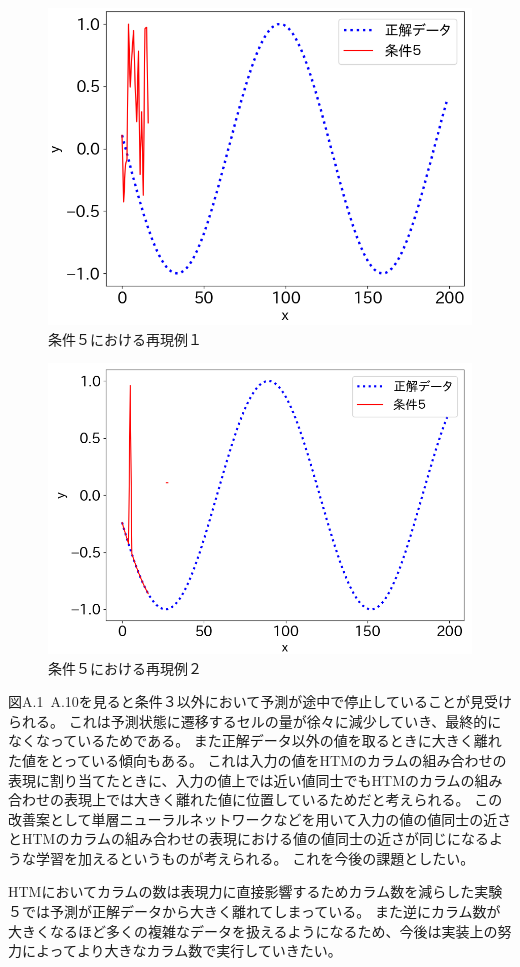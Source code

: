 \begin{figure}[hp]
  \begin{center}
    \includegraphics[width=12cm]{./fig/append9}
    \caption{条件５における再現例１}
    \label{fig:append9}
  \end{center}
\end{figure}

\begin{figure}[ht]
  \begin{center}
    \includegraphics[width=12cm]{./fig/append10}
    \caption{条件５における再現例２}
    \label{fig:append10}
  \end{center}
\end{figure}

\newpage
図A.1~A.10を見ると条件３以外において予測が途中で停止していることが見受けられる。
これは予測状態に遷移するセルの量が徐々に減少していき、最終的になくなっているためである。
また正解データ以外の値を取るときに大きく離れた値をとっている傾向もある。
これは入力の値をHTMのカラムの組み合わせの表現に割り当てたときに、入力の値上では近い値同士でもHTMのカラムの組み合わせの表現上では大きく離れた値に位置しているためだと考えられる。
この改善案として単層ニューラルネットワークなどを用いて入力の値の値同士の近さとHTMのカラムの組み合わせの表現における値の値同士の近さが同じになるような学習を加えるというものが考えられる。
これを今後の課題としたい。

HTMにおいてカラムの数は表現力に直接影響するためカラム数を減らした実験５では予測が正解データから大きく離れてしまっている。
また逆にカラム数が大きくなるほど多くの複雑なデータを扱えるようになるため、今後は実装上の努力によってより大きなカラム数で実行していきたい。
